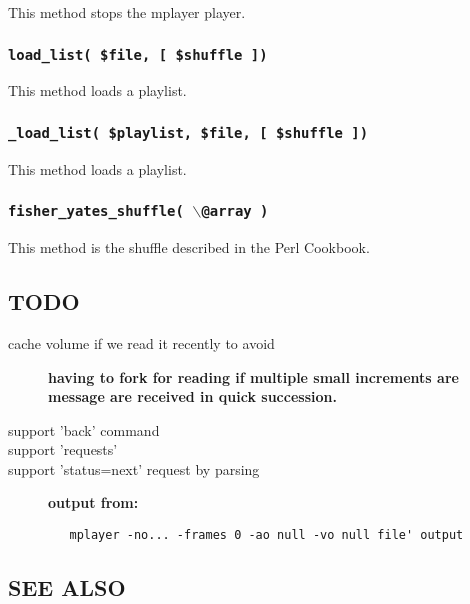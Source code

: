 This method stops the mplayer player.

\subsubsection*{\texttt{load\_list( \$file, [ \$shuffle ])}\label{xpl-mplayer_load_list_file_shuffle_}}


This method loads a playlist.

\subsubsection*{\texttt{\_load\_list( \$playlist, \$file, [ \$shuffle ])}\label{xpl-mplayer__load_list_playlist_file_shuffle_}}


This method loads a playlist.

\subsubsection*{\texttt{fisher\_yates\_shuffle( $\backslash$@array )}\label{xpl-mplayer_fisher_yates_shuffle_backslash_array_}}


This method is the shuffle described in the Perl Cookbook.

\subsection*{TODO\label{xpl-mplayer_TODO}}
\begin{description}

\item[{cache volume if we read it recently to avoid}] \textbf{having to fork for reading if multiple small increments are message are received in quick succession.}
\item[{support 'back' command}] \mbox{}
\item[{support 'requests'}] \mbox{}
\item[{support 'status=next' request by parsing}] \textbf{output from:}\begin{verbatim}
   mplayer -no... -frames 0 -ao null -vo null file' output
\end{verbatim}
\end{description}
\subsection*{SEE ALSO\label{xpl-mplayer_SEE_ALSO}}


